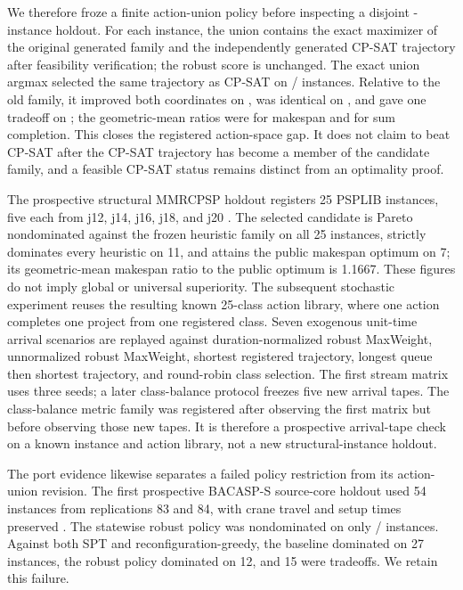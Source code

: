 \documentclass[opre,dblanonrev]{informs4}
\begin{document}
We therefore froze a finite action-union policy before inspecting a disjoint
\FjspUnionInstanceCount-instance holdout.  For each instance, the union contains
the exact maximizer of the original generated family and the independently
generated CP-SAT trajectory after feasibility verification; the robust score is
unchanged.  The exact union argmax selected the same trajectory as CP-SAT on
\FjspUnionSameSolverCount{}/\FjspUnionInstanceCount{} instances.  Relative to
the old family, it improved both coordinates on
\FjspUnionImprovesBaseCount{}, was identical on \FjspUnionSameBaseCount{}, and
gave one tradeoff on \FjspUnionTradeoffBaseCount{}; the geometric-mean ratios
were \FjspUnionMakespanRatio{} for makespan and \FjspUnionFlowRatio{} for sum
completion.  This closes the registered action-space gap.  It does not claim to
beat CP-SAT after the CP-SAT trajectory has become a member of the candidate
family, and a feasible CP-SAT status remains distinct from an optimality proof.

The prospective structural MMRCPSP holdout registers 25 PSPLIB instances, five
each from j12, j14, j16, j18, and j20 \citep{kolisch1997psplib}.  The selected
candidate is Pareto nondominated against the frozen heuristic family on all 25
instances, strictly dominates every heuristic on 11, and attains the public
makespan optimum on 7; its geometric-mean makespan ratio to the public optimum
is 1.1667.  These figures do not imply global or universal superiority.  The
subsequent stochastic experiment reuses the resulting known 25-class action
library, where one action completes one project from one registered class.
Seven exogenous unit-time arrival scenarios are replayed against
duration-normalized robust MaxWeight,
unnormalized robust MaxWeight, shortest registered trajectory, longest queue
then shortest trajectory, and round-robin class selection.  The first stream
matrix uses three seeds; a later class-balance protocol freezes five new arrival
tapes.  The class-balance metric family was registered after observing the
first matrix but before observing those new tapes.  It is therefore a
prospective arrival-tape check on a known instance and action library, not a new
structural-instance holdout.

The port evidence likewise separates a failed policy restriction from its
action-union revision.  The first prospective BACASP-S source-core holdout used
54 instances from replications 83 and 84, with crane travel and setup times
preserved \citep{correcher2024berth}.  The statewise robust policy was
nondominated on only \PortStatewiseNondominatedCount{}/
\PortStatewiseInstanceCount{} instances.  Against both SPT and
reconfiguration-greedy, the baseline dominated on 27 instances, the robust
policy dominated on 12, and 15 were tradeoffs.  We retain this failure.
\end{document}
